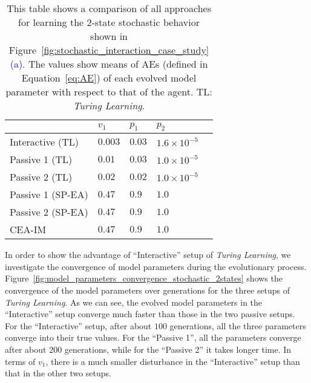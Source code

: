 \begin{table}[!t] 
\caption{This table shows a comparison of all approaches for learning the 2-state stochastic behavior shown in Figure~\ref{fig:stochastic_interaction_case_study}\textcolor{blue}{(a)}. The values show means of AEs (defined in Equation~\ref{eq:AE}) of each evolved model parameter with respect to that of the agent. TL: \textit{Turing Learning}.} 
\renewcommand{\arraystretch}{1.1}
\centering %
\begin{tabular}{l l l l l} %
\hline\hline  %
 & $v_1$ & $p_1$ & $p_2$ &  \\  
\hline   %
Interactive (TL) & $0.003$ & $0.03$ & $1.6\times10^{-5}$ \\ %
Passive 1 (TL) & $0.01$ & $0.03$ & $1.0\times10^{-5}$ \\ 
Passive 2 (TL) & $0.02$ & $0.02$ & $1.0\times10^{-5}$ \\ 
Passive 1 (SP-EA) & $0.47$ & $0.9$ & $1.0$ \\ 
Passive 2 (SP-EA) & $0.47$ & $0.9$ & $1.0$ \\ 
CEA-IM & $0.47$ & $0.9$ & $1.0$ \\
\hline %
\end{tabular} 
\label{table:relative_accuracy_stochastic_2states} 
\end{table} 

In order to show the advantage of ``Interactive'' setup of \textit{Turing Learning}, we investigate the convergence of model parameters during the evolutionary process. Figure~\ref{fig:model_parameters_convergence_stochastic_2states} shows the convergence of the model parameters over generations for the three setups of \textit{Turing Learning}. As we can see, the evolved model parameters in the ``Interactive'' setup converge much faster than those in the two passive setups. For the ``Interactive'' setup, after about $100$ generations, all the three parameters converge into their true values. For the ``Passive 1'', all the parameters converge after about $200$ generations, while for the ``Passive 2'' it takes longer time. In terms of $v_1$, there is a much smaller disturbance in the ``Interactive'' setup than that in the other two setups. 


